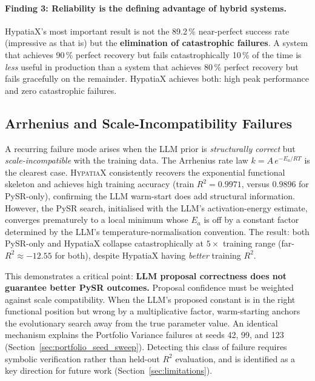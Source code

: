 \documentclass[twoside,11pt]{article}
\newcommand{\Rsq}{R^{2}}
\begin{document}
\paragraph{Finding 3: Reliability is the defining advantage of hybrid systems.}
HypatiaX's most important result is not the 89.2\,\% near-perfect success rate
(impressive as that is) but the \textbf{elimination of catastrophic failures}.
A system that achieves 90\,\% perfect recovery but fails catastrophically 10\,\%
of the time is \emph{less} useful in production than a system that achieves 80\,\%
perfect recovery but fails gracefully on the remainder.  HypatiaX achieves both:
high peak performance and zero catastrophic failures.

\subsection{Arrhenius and Scale-Incompatibility Failures}
\label{sec:arrhenius_failure}

A recurring failure mode arises when the LLM prior is \emph{structurally correct}
but \emph{scale-incompatible} with the training data.  The Arrhenius rate law
$k = A\,e^{-E_a / RT}$ is the clearest case.  \textsc{HypatiaX} consistently
recovers the exponential functional skeleton and achieves high training accuracy
(train $\Rsq = 0.9971$, versus $0.9896$ for PySR-only), confirming the LLM
warm-start does add structural information.  However, the PySR search,
initialised with the LLM's activation-energy estimate, converges prematurely to a
local minimum whose $E_a$ is off by a constant factor determined by the LLM's
temperature-normalisation convention.  The result: both PySR-only and HypatiaX
collapse catastrophically at $5\times$ training range (far-$\Rsq \approx -12.55$
for both), despite HypatiaX having \emph{better} training $\Rsq$.

This demonstrates a critical point: \textbf{LLM proposal correctness does not
guarantee better PySR outcomes.}  Proposal confidence must be weighted against
scale compatibility.  When the LLM's proposed constant is in the right functional
position but wrong by a multiplicative factor, warm-starting anchors the
evolutionary search away from the true parameter value.  An identical mechanism
explains the Portfolio Variance failures at seeds 42, 99, and 123
(Section~\ref{sec:portfolio_seed_sweep}).  Detecting this class of failure
requires symbolic verification rather than held-out $\Rsq$ evaluation, and is
identified as a key direction for future work (Section~\ref{sec:limitations}).
\end{document}
